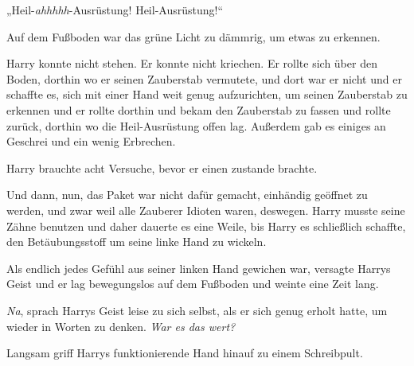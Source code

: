 „Heil-\emph{ahhhhh}-Ausrüstung! Heil-Ausrüstung!“

Auf dem Fußboden war das grüne Licht zu dämmrig, um etwas zu erkennen.

Harry konnte nicht stehen. Er konnte nicht kriechen. Er rollte sich über den Boden, dorthin wo er seinen Zauberstab vermutete, und dort war er nicht und er schaffte es, sich mit einer Hand weit genug aufzurichten, um seinen Zauberstab zu erkennen und er rollte dorthin und bekam den Zauberstab zu fassen und rollte zurück, dorthin wo die Heil-Ausrüstung offen lag. Außerdem gab es einiges an Geschrei und ein wenig Erbrechen.

Harry brauchte acht Versuche, bevor er einen  zustande brachte.

Und dann, nun, das Paket war nicht dafür gemacht, einhändig geöffnet zu werden, und zwar weil alle Zauberer Idioten waren, deswegen. Harry musste seine Zähne benutzen und daher dauerte es eine Weile, bis Harry es schließlich schaffte, den Betäubungsstoff um seine linke Hand zu wickeln.

Als endlich jedes Gefühl aus seiner linken Hand gewichen war, versagte Harrys Geist und er lag bewegungslos auf dem Fußboden und weinte eine Zeit lang.

\emph{Na}, sprach Harrys Geist leise zu sich selbst, als er sich genug erholt hatte, um wieder in Worten zu denken. \emph{War es das wert?}

Langsam griff Harrys funktionierende Hand hinauf zu einem Schreibpult.

